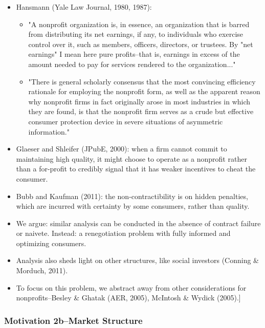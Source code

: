 \documentclass[11pt]{article}%
\begin{document}
\begin{itemize}
\item Hansmann (Yale Law Journal, 1980, 1987):

\begin{itemize}
\item "A nonprofit organization is, in essence, an organization that is barred
from distributing its net earnings, if any, to individuals who exercise
control over it, such as members, officers, directors, or trustees. By "net
earnings" I mean here pure profits--that is, earnings in excess of the amount
needed to pay for services rendered to the organization..."

\item "There is general scholarly consensus that the most convincing
efficiency rationale for employing the nonprofit form, as well as the apparent
reason why nonprofit firms in fact originally arose in most industries in
which they are found, is that the nonprofit firm serves as a crude but
effective consumer protection device in severe situations of asymmetric information."
\end{itemize}

\item Glaeser and Shleifer (JPubE, 2000): when a firm cannot commit to
maintaining high quality, it might choose to operate as a nonprofit rather
than a for-profit to credibly signal that it has weaker incentives to cheat
the consumer.

\item Bubb and Kaufman (2011): the non-contractibility is on hidden penalties,
which are incurred with certainty by some consumers, rather than quality.

\item We argue: similar analysis can be conducted in the absence of contract
failure or naivete. Instead: a renegotiation problem with fully informed and
optimizing consumers.

\item Analysis also sheds light on other structures, like social investors
(Conning \& Morduch, 2011).

\item \lbrack To focus on this problem, we abstract away from other
considerations for nonprofits--Besley \& Ghatak (AER, 2005), McIntosh \&
Wydick (2005).]
\end{itemize}

%

\frametitle{Motivation 2b--Market Structure}%
\end{document}
